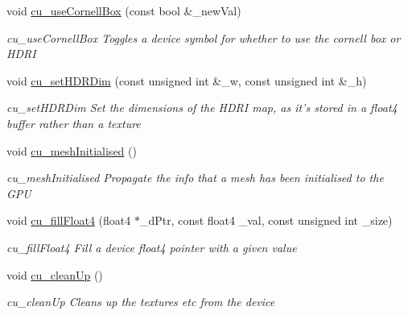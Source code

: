 \begin{DoxyCompactItemize}
void \hyperlink{PathTracer_8cuh_a84c7787fce87bcd3aecd756480fba258}{cu\-\_\-use\-Cornell\-Box} (const bool \&\-\_\-new\-Val)
\begin{DoxyCompactList}\small\item\em cu\-\_\-use\-Cornell\-Box Toggles a device symbol for whether to use the cornell box or H\-D\-R\-I \end{DoxyCompactList}\item 
void \hyperlink{PathTracer_8cuh_a57be5801cbad9c51e6ab73ea59a32c62}{cu\-\_\-set\-H\-D\-R\-Dim} (const unsigned int \&\-\_\-w, const unsigned int \&\-\_\-h)
\begin{DoxyCompactList}\small\item\em cu\-\_\-set\-H\-D\-R\-Dim Set the dimensions of the H\-D\-R\-I map, as it's stored in a float4 buffer rather than a texture \end{DoxyCompactList}\item 
\hypertarget{PathTracer_8cuh_aed211bb31208e488f637a15f9a68587e}{void \hyperlink{PathTracer_8cuh_aed211bb31208e488f637a15f9a68587e}{cu\-\_\-mesh\-Initialised} ()}\label{PathTracer_8cuh_aed211bb31208e488f637a15f9a68587e}

\begin{DoxyCompactList}\small\item\em cu\-\_\-mesh\-Initialised Propagate the info that a mesh has been initialised to the G\-P\-U \end{DoxyCompactList}\item 
void \hyperlink{PathTracer_8cuh_a7cfaf8db845b7c5c5af7361d54a10ca0}{cu\-\_\-fill\-Float4} (float4 $\ast$\-\_\-d\-Ptr, const float4 \-\_\-val, const unsigned int \-\_\-size)
\begin{DoxyCompactList}\small\item\em cu\-\_\-fill\-Float4 Fill a device float4 pointer with a given value \end{DoxyCompactList}\item 
\hypertarget{PathTracer_8cuh_a6a3d532cae6d73f9efe5bf195eb14d1e}{void \hyperlink{PathTracer_8cuh_a6a3d532cae6d73f9efe5bf195eb14d1e}{cu\-\_\-clean\-Up} ()}\label{PathTracer_8cuh_a6a3d532cae6d73f9efe5bf195eb14d1e}

\begin{DoxyCompactList}\small\item\em cu\-\_\-clean\-Up Cleans up the textures etc from the device \end{DoxyCompactList}\end{DoxyCompactItemize}


